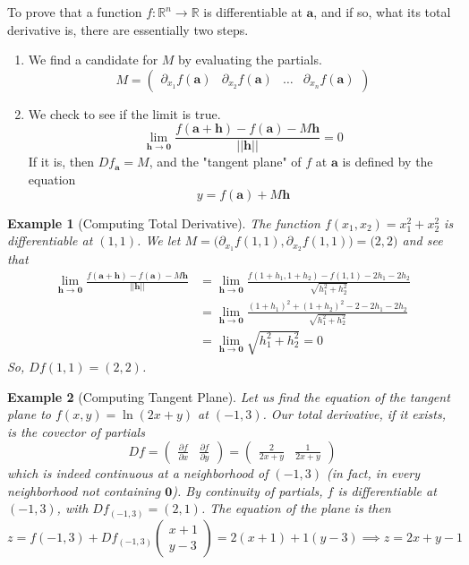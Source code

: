 \documentclass{article}
\newtheorem{example}{Example}[section]
\theoremstyle{remark}
\theoremstyle{definition}
\begin{document}
To prove that a function $f: \mathbb{R}^n \longrightarrow \mathbb{R}$ is differentiable at $\mathbf{a}$, and if so, what its total derivative is, there are essentially two steps. 
\begin{enumerate}
    \item We find a candidate for $M$ by evaluating the partials. 
    \[M = \begin{pmatrix} \partial_{x_1} f(\mathbf{a}) & \partial_{x_2} f(\mathbf{a}) & \ldots & \partial_{x_n} f(\mathbf{a}) \end{pmatrix}\]
    \item We check to see if the limit is true. 
    \[\lim_{\mathbf{h} \rightarrow \mathbf{0}} \frac{f(\mathbf{a} + \mathbf{h}) - f(\mathbf{a}) - M \mathbf{h}}{||\mathbf{h}||} = 0\]
    If it is, then $D f_\mathbf{a} = M$, and the "tangent plane" of $f$ at $\mathbf{a}$ is defined by the equation 
    \[y = f(\mathbf{a}) + M \mathbf{h}\]
\end{enumerate}

\begin{example}[Computing Total Derivative]
The function $f(x_1, x_2) = x_1^2 + x_2^2$ is differentiable at $(1, 1)$. We let $M = \big(\partial_{x_1} f(1, 1), \partial_{x_2} f(1, 1) \big) = \big(2, 2\big)$ and see that 
\begin{align*}
    \lim_{\mathbf{h} \rightarrow \mathbf{0}} \frac{f(\mathbf{a} + \mathbf{h}) - f(\mathbf{a}) - M \mathbf{h}}{||\mathbf{h}||} & = \lim_{\mathbf{h} \rightarrow \mathbf{0}} \frac{f(1 + h_1, 1 + h_2) - f(1, 1) - 2 h_1 - 2 h_2}{\sqrt{h_1^2 + h_2^2}} \\
    & = \lim_{\mathbf{h} \rightarrow \mathbf{0}} \frac{(1 + h_1)^2 + (1 + h_2)^2 - 2 - 2 h_1 - 2 h_2}{\sqrt{h_1^2 + h_2^2}} \\
    & = \lim_{\mathbf{h} \rightarrow \mathbf{0}} \sqrt{h_1^2 + h_2^2} = 0
\end{align*}
So, $D f (1, 1) = (2, 2)$. 
\end{example}

\begin{example}[Computing Tangent Plane]
Let us find the equation of the tangent plane to $f(x, y) = \ln(2x + y)$ at $(-1, 3)$. Our total derivative, if it exists, is the covector of partials
\[D f = \begin{pmatrix} \frac{\partial f}{\partial x} & \frac{\partial f}{\partial y} \end{pmatrix} = \begin{pmatrix} \frac{2}{2x + y} & \frac{1}{2x + y} \end{pmatrix}\]
which is indeed continuous at a neighborhood of $(-1, 3)$ (in fact, in every neighborhood not containing $\mathbf{0}$). By continuity of partials, $f$ is differentiable at $(-1, 3)$, with $D f_{(-1, 3)} = (2, 1)$. The equation of the plane is then 
\[z = f(-1, 3) + D f_{(-1, 3)} \begin{pmatrix} x + 1\\ y - 3 \end{pmatrix} = 2(x + 1) + 1 (y - 3) \implies z = 2x + y - 1\]
\end{example}
\end{document}
